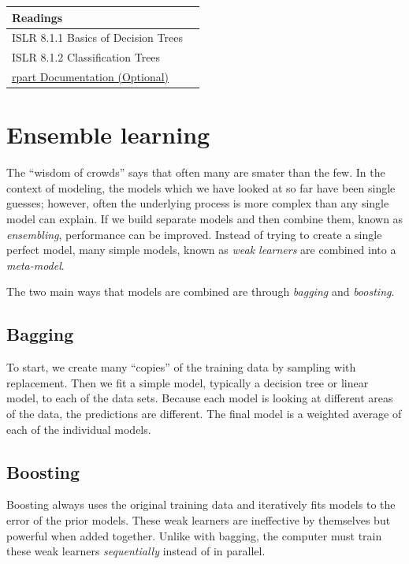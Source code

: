 \documentclass[]{book}
\begin{document}
\begin{longtable}[]{@{}ll@{}}
\toprule
Readings &\tabularnewline
\midrule
\endhead
ISLR 8.1.1 Basics of Decision Trees &\tabularnewline
ISLR 8.1.2 Classification Trees &\tabularnewline
\href{https://cran.r-project.org/web/packages/rpart/vignettes/longintro.pdf}{rpart Documentation (Optional)} &\tabularnewline
\bottomrule
\end{longtable}

\hypertarget{ensemble-learning}{%
\section{Ensemble learning}\label{ensemble-learning}}

The ``wisdom of crowds'' says that often many are smater than the few. In the context of modeling, the models which we have looked at so far have been single guesses; however, often the underlying process is more complex than any single model can explain. If we build separate models and then combine them, known as \emph{ensembling}, performance can be improved. Instead of trying to create a single perfect model, many simple models, known as \emph{weak learners} are combined into a \emph{meta-model}.

The two main ways that models are combined are through \emph{bagging} and \emph{boosting}.

\hypertarget{bagging}{%
\subsection{Bagging}\label{bagging}}

To start, we create many ``copies'' of the training data by sampling with replacement. Then we fit a simple model, typically a decision tree or linear model, to each of the data sets. Because each model is looking at different areas of the data, the predictions are different. The final model is a weighted average of each of the individual models.

\hypertarget{boosting}{%
\subsection{Boosting}\label{boosting}}

Boosting always uses the original training data and iteratively fits models to the error of the prior models. These weak learners are ineffective by themselves but powerful when added together. Unlike with bagging, the computer must train these weak learners \emph{sequentially} instead of in parallel.
\end{document}
